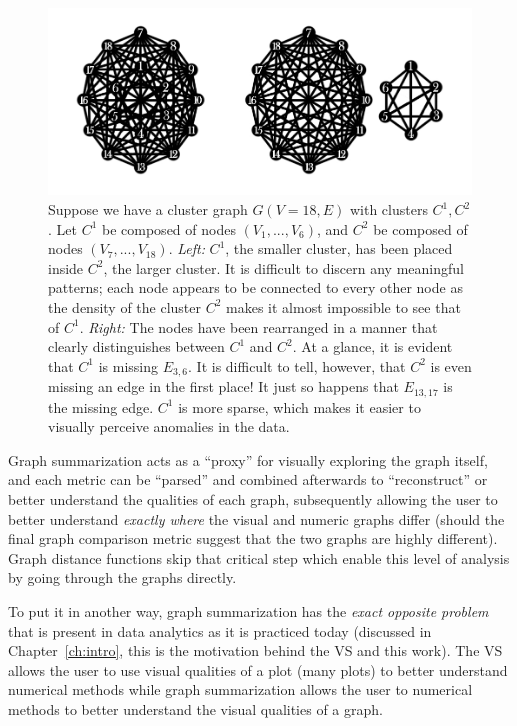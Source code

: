 \begin{figure}[htb]
	\begin{center}
		\includegraphics[width=1\linewidth]{ch-gc/figures/arr_density}
		\caption[Difficulties with graph visualization.]{
		Suppose we have a cluster graph $G(V = 18,E)$ with clusters $C^1,C^2$. 
		Let $C^1$ be composed of nodes $(V_1,...,V_6)$, and $C^2$ be composed 
		of nodes $(V_7,...,V_{18})$. 
		\textit{Left:} $C^1$, the smaller cluster, has been placed inside 
		$C^2$, the larger cluster. It is difficult to discern any meaningful 
		patterns; each node appears to be connected to every other node as the 
		density of the cluster $C^2$ makes it almost impossible to see that of 
		$C^1$.
		\textit{Right:} The nodes have been rearranged in a manner that clearly 
		distinguishes between $C^1$ and $C^2$. At a glance, it is evident that 
		$C^1$ is missing $E_{3,6}$. It is difficult to tell, however, that 
		$C^2$ is even missing an edge in the first place! It just so happens 
		that $E_{13,17}$ is the missing edge.
		$C^1$ is more sparse, which makes it easier to visually perceive 
		anomalies in the data.}
		\label{fig:gc:arr_density}
	\end{center}
\end{figure}

Graph summarization acts as a ``proxy'' for visually exploring the graph 
itself, and each metric can be ``parsed'' and combined afterwards to 
``reconstruct'' or better understand the qualities of each graph, subsequently 
allowing the user to better understand \textit{exactly where} the visual and 
numeric graphs differ (should the final graph comparison metric suggest that 
the two graphs are highly different). Graph distance functions skip that 
critical step which enable this level of analysis by going through the graphs 
directly.

To put it in another way, graph summarization has the \textit{exact opposite 
problem} that is present in data analytics as it is practiced today (discussed 
in Chapter~\ref{ch:intro}, this is the motivation behind the VS and this work). 
The VS allows the user to use visual qualities of a plot (many plots) to better 
understand numerical methods while graph summarization allows the user to 
numerical methods to better understand the visual qualities of a graph. 


